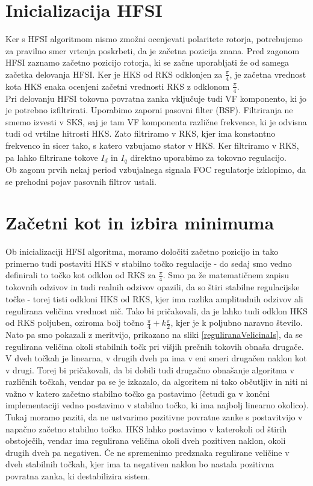 \documentclass[a4paper,twoside,openright,12pt,slovene]{book}
\begin{document}
\section{Inicializacija HFSI}

Ker s HFSI algoritmom nismo zmožni ocenjevati polaritete rotorja, potrebujemo za pravilno smer vrtenja poskrbeti, da je začetna pozicija znana. Pred zagonom HFSI zaznamo začetno pozicijo rotorja, ki
se začne uporabljati že od samega začetka delovanja HFSI. Ker je HKS od RKS odklonjen za $\frac{\pi}{4}$, je začetna vrednost kota HKS enaka ocenjeni začetni vrednosti RKS z odklonom $\frac{\pi}{4}$.
\\
Pri delovanju HFSI tokovna povratna zanka vključuje tudi VF komponento, ki jo je potrebno izfiltrirati. Uporabimo zaporni pasovni filter (BSF). Filtriranja ne smemo izvesti v SKS, saj je tam VF
komponenta različne frekvence, ki je odvisna tudi od vrtilne hitrosti HKS. Zato filtriramo v RKS, kjer ima konstantno frekvenco in sicer tako, s katero vzbujamo stator v HKS. Ker filtriramo v RKS, pa
lahko filtrirane tokove $I_d$ in $I_q$ direktno uporabimo za tokovno regulacijo. 
\\
Ob zagonu prvih nekaj period vzbujalnega signala FOC regulatorje izklopimo, da se prehodni pojav pasovnih filtrov ustali. 

\section{Začetni kot in izbira minimuma}

Ob inicializaciji HFSI algoritma, moramo določiti začetno pozicijo in tako primerno tudi postaviti HKS v stabilno točko regulacije - do sedaj smo vedno definirali to točko kot odklon od RKS za
$\frac{\pi}{4}$. Smo pa že matematičnem zapisu tokovnih odzivov in tudi realnih odzivov opazili, da so štiri stabilne regulacijske točke - torej tisti odkloni HKS od RKS, kjer ima razlika amplitudnih
odzivov ali regulirana veličina vrednost nič. Tako bi pričakovali, da je lahko tudi odklon HKS od RKS poljuben, oziroma bolj točno $\frac{\pi}{4} + k\frac{\pi}{2}$, kjer je k poljubno naravno število.
Nato pa smo pokazali z meritvijo, prikazano na sliki \ref{reguliranaVelicinaIs}, da se regulirana veličina okoli stabilnih točk pri višjih prečnih tokovih obnaša drugače. V dveh točkah je linearna, v
drugih dveh pa ima v eni smeri drugačen naklon kot v drugi. Torej bi pričakovali, da bi dobili tudi drugačno obnašanje algoritma v različnih točkah, vendar pa se je izkazalo, da algoritem ni tako
občutljiv in niti ni važno v katero začetno stabilno točko ga postavimo (četudi ga v končni implementaciji vedno postavimo v stabilno točko, ki ima najbolj linearno okolico). Tukaj moramo paziti, da
ne ustvarimo pozitivne povratne zanke s postavitvijo v napačno začetno stabilno točko. HKS lahko postavimo v katerokoli od štirih obstoječih, vendar ima regulirana veličina okoli dveh pozitiven
naklon, okoli drugih dveh pa negativen. Če ne spremenimo predznaka regulirane veličine v dveh stabilnih točkah, kjer ima ta negativen naklon bo nastala pozitivna povratna zanka, ki destabilizira sistem.
\end{document}
